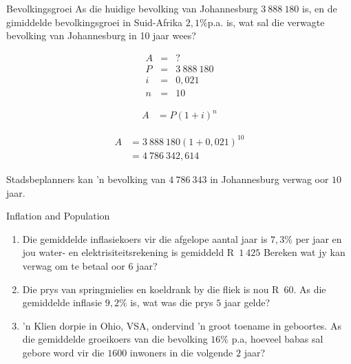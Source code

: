 \begin{wex}{Bevolkingsgroei}
    {As die huidige bevolking van Johannesburg $3~888~180$ is, en de gimiddelde bevolkingsgroei in Suid-Afrika $2,1\%$p.a. is, wat sal die verwagte bevolking van Johannesburg in 10 jaar wees?}{
    
    \begin{eqnarray*}
	A &=& ?\\
	P &=& 3~888~180\\
	i &=& 0,021\\
	n &=& 10
    \end{eqnarray*}

    \begin{align*}
	A &= P(1 + i)^n
    \end{align*}

    \begin{align*}
	A &= 3~888~180(1 + 0,021)^{10}\\
	  &= 4~786~342,614
    \end{align*}

    Stadsbeplanners kan 'n bevolking van $4~786~343$ in Johannesburg verwag oor $10$ jaar.
    }
\end{wex}


\begin{exercises}{Inflation and Population}
{
    \begin{enumerate}[label=\textbf{\arabic*}.]
	\item Die gemiddelde inflasiekoers vir die afgelope aantal jaar is $7,3\%$ per jaar en jou water- en elektrisiteitsrekening is gemiddeld R~$1~425$ Bereken wat jy kan verwag om te betaal oor 6 jaar?

	\item Die prys van springmielies en koeldrank by die fliek is nou R~$60$. As die gemiddelde inflasie $9,2\%$ is, wat was die prys $5$ jaar gelde?

	\item 'n Klien dorpie in Ohio, VSA, ondervind 'n groot toename in geboortes. As die gemiddelde groeikoers van die bevolking $16\%$ p.a, hoeveel babas sal gebore word vir die $1600$ inwoners in die volgende $2$ jaar?\\
    \end{enumerate}

}
\end{exercises}



